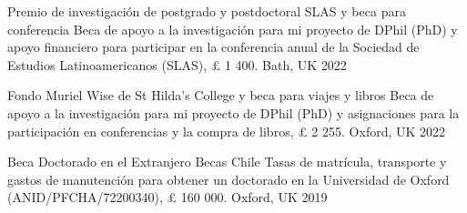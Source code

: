 





\vspace{1mm}

\begin{cvhonors}
\cvhonor
{Premio de investigación de postgrado y postdoctoral SLAS y beca para conferencia} 
{Beca de apoyo a la investigación para mi proyecto de DPhil (PhD) y apoyo financiero para participar en la conferencia anual de la Sociedad de Estudios Latinoamericanos (SLAS), {\pounds} 1 400.}
{Bath, UK}
{2022}
\end{cvhonors}

\vspace{1mm}

\begin{cvhonors}
\cvhonor
{Fondo Muriel Wise de St Hilda's College y beca para viajes y libros} 
{Beca de apoyo a la investigación para mi proyecto de DPhil (PhD) y asignaciones para la participación en conferencias y la compra de libros, {\pounds} 2 255.} 
{Oxford, UK}
{2022}
\end{cvhonors}

\vspace{1mm}

\begin{cvhonors}
\cvhonor
{Beca Doctorado en el Extranjero Becas Chile} 
{Tasas de matrícula, transporte y gastos de manutención para obtener un doctorado en la Universidad de Oxford (ANID/PFCHA/72200340), {\pounds} 160 000.}
{Oxford, UK}
{2019}
\end{cvhonors}

\vspace{1mm}


